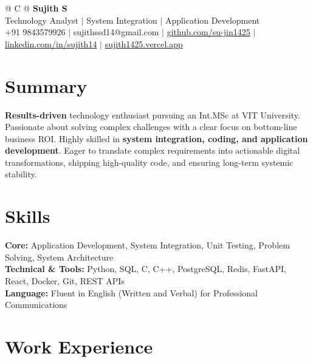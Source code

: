 \documentclass[a4paper,11pt]{article}
\newcommand{\ulink}[2]{\href{#1}{#2}}
\begin{document}
\pagestyle{empty}

\begin{tabularx}{\linewidth}{@{} C @{}}
{\color[HTML]{000000}\fontsize{30}{35}\selectfont\bfseries Sujith S} \\[5pt]
{\fontsize{10.5}{12.5}\selectfont\color[HTML]{3A3A3A}
Technology Analyst $|$ System Integration $|$ Application Development} \\[6pt]
{\fontsize{9.5}{11.5}\selectfont\textcolor[HTML]{3A3A3A}{+91 9843579926 $|$ sujithssd14@gmail.com $|$ \ulink{https://github.com/su-jin1425}{github.com/su-jin1425} $|$ \ulink{https://linkedin.com/in/sujith14}{linkedin.com/in/sujith14} $|$ \ulink{https://sujith1425.vercel.app}{sujith1425.vercel.app}}}
\end{tabularx}

\section{Summary}
\vspace{2pt}

{\color[HTML]{0A0A0A}\fontsize{11}{14}\selectfont
\textbf{Results-driven} technology enthusiast pursuing an Int.MSc at VIT University. Passionate about solving complex challenges with a clear focus on bottom-line business ROI. Highly skilled in \textbf{system integration, coding, and application development}. Eager to translate complex requirements into actionable digital transformations, shipping high-quality code, and ensuring long-term systemic stability.}

\section{Skills}
\vspace{2pt}

{\color[HTML]{0A0A0A}\fontsize{11}{14}\selectfont
\textbf{Core:} Application Development, System Integration, Unit Testing, Problem Solving, System Architecture \\[2pt]
\textbf{Technical \& Tools:} Python, SQL, C, C++, PostgreSQL, Redis, FastAPI, React, Docker, Git, REST APIs \\[2pt]
\textbf{Language:} Fluent in English (Written and Verbal) for Professional Communications}

\section{Work Experience}
\vspace{2pt}
\end{document}
